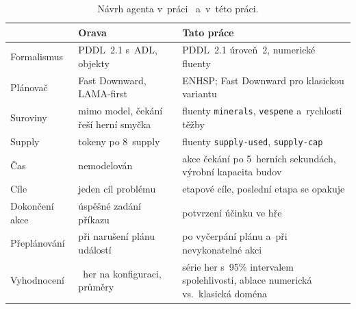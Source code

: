 \begin{table}[ht]
	\centering
	\caption{Návrh agenta v~práci~\cite{Orava2025} a~v~této práci.}
	\label{tab:orava-vs-tato}
	\begin{tabularx}{\textwidth}{@{} >{\raggedright\arraybackslash}p{2.6cm} >{\raggedright\arraybackslash}X >{\raggedright\arraybackslash}X @{}}
		\toprule
		 & \textbf{Orava~\cite{Orava2025}} & \textbf{Tato práce} \\
		\midrule
		Formalismus & PDDL~2.1 s~ADL, objekty & PDDL~2.1 úroveň~2, numerické fluenty \\
		\addlinespace
		Plánovač & Fast Downward, LAMA-first & ENHSP; Fast Downward pro klasickou variantu \\
		\addlinespace
		Suroviny & mimo model, čekání řeší herní smyčka & fluenty \texttt{minerals}, \texttt{vespene} a~rychlosti těžby \\
		\addlinespace
		Supply & tokeny po 8~supply & fluenty \texttt{supply-used}, \texttt{supply-cap} \\
		\addlinespace
		Čas & nemodelován & akce čekání po 5~herních sekundách, výrobní kapacita budov \\
		\addlinespace
		Cíle & jeden cíl problému & etapové cíle, poslední etapa se opakuje \\
		\addlinespace
		Dokončení akce & úspěšné zadání příkazu & potvrzení účinku ve hře \\
		\addlinespace
		Přeplánování & při narušení plánu událostí & po vyčerpání plánu a~při nevykonatelné akci \\
		\addlinespace
		Vyhodnocení & 20~her na konfiguraci, průměry & série her s~95\% intervalem spolehlivosti, ablace numerická vs.\ klasická doména \\
		\bottomrule
	\end{tabularx}
\end{table}
